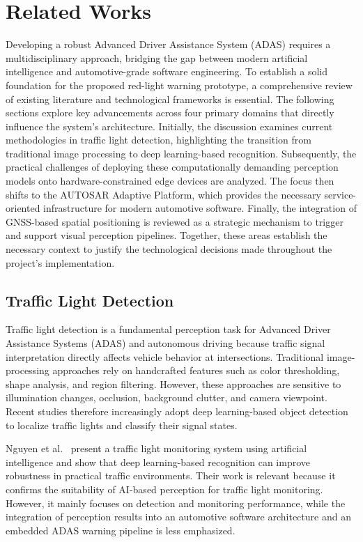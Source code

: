 \chapter{Related Works}

Developing a robust Advanced Driver Assistance System (ADAS) requires a multidisciplinary approach, bridging the gap between modern artificial intelligence and automotive-grade software engineering. To establish a solid foundation for the proposed red-light warning prototype, a comprehensive review of existing literature and technological frameworks is essential. The following sections explore key advancements across four primary domains that directly influence the system's architecture. Initially, the discussion examines current methodologies in traffic light detection, highlighting the transition from traditional image processing to deep learning-based recognition. Subsequently, the practical challenges of deploying these computationally demanding perception models onto hardware-constrained edge devices are analyzed. The focus then shifts to the AUTOSAR Adaptive Platform, which provides the necessary service-oriented infrastructure for modern automotive software. Finally, the integration of GNSS-based spatial positioning is reviewed as a strategic mechanism to trigger and support visual perception pipelines. Together, these areas establish the necessary context to justify the technological decisions made throughout the project's implementation.

\section{Traffic Light Detection}

Traffic light detection is a fundamental perception task for Advanced Driver Assistance Systems (ADAS) and autonomous driving because traffic signal interpretation directly affects vehicle behavior at intersections. Traditional image-processing approaches rely on handcrafted features such as color thresholding, shape analysis, and region filtering. However, these approaches are sensitive to illumination changes, occlusion, background clutter, and camera viewpoint. Recent studies therefore increasingly adopt deep learning-based object detection to localize traffic lights and classify their signal states.

Nguyen et al.~\cite{Nguyen2025TrafficLightMonitoring} present a traffic light monitoring system using artificial intelligence and show that deep learning-based recognition can improve robustness in practical traffic environments. Their work is relevant because it confirms the suitability of AI-based perception for traffic light monitoring. However, it mainly focuses on detection and monitoring performance, while the integration of perception results into an automotive software architecture and an embedded ADAS warning pipeline is less emphasized.

